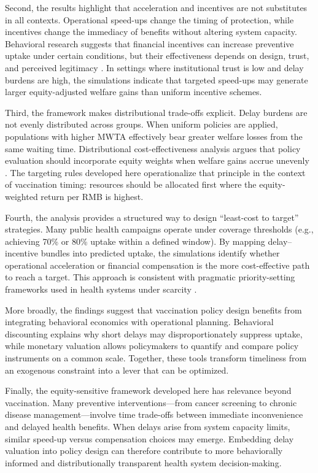 \documentclass[doublespacing]{utdthesis}
\let\cite=\citep
\begin{document}
Second, the results highlight that acceleration and incentives are not substitutes in all contexts. Operational speed-ups change the timing of protection, while incentives change the immediacy of benefits without altering system capacity. Behavioral research suggests that financial incentives can increase preventive uptake under certain conditions, but their effectiveness depends on design, trust, and perceived legitimacy \cite{Gneezy2011,Thirumurthy2022}. In settings where institutional trust is low and delay burdens are high, the simulations indicate that targeted speed-ups may generate larger equity-adjusted welfare gains than uniform incentive schemes.

Third, the framework makes distributional trade-offs explicit. Delay burdens are not evenly distributed across groups. When uniform policies are applied, populations with higher MWTA effectively bear greater welfare losses from the same waiting time. Distributional cost-effectiveness analysis argues that policy evaluation should incorporate equity weights when welfare gains accrue unevenly \cite{Asaria2016,Cookson2017}. The targeting rules developed here operationalize that principle in the context of vaccination timing: resources should be allocated first where the equity-weighted return per RMB is highest.

Fourth, the analysis provides a structured way to design “least-cost to target” strategies. Many public health campaigns operate under coverage thresholds (e.g., achieving 70\% or 80\% uptake within a defined window). By mapping delay–incentive bundles into predicted uptake, the simulations identify whether operational acceleration or financial compensation is the more cost-effective path to reach a target. This approach is consistent with pragmatic priority-setting frameworks used in health systems under scarcity \cite{Emanuel2020,Norheim2014}.

More broadly, the findings suggest that vaccination policy design benefits from integrating behavioral economics with operational planning. Behavioral discounting explains why short delays may disproportionately suppress uptake, while monetary valuation allows policymakers to quantify and compare policy instruments on a common scale. Together, these tools transform timeliness from an exogenous constraint into a lever that can be optimized.

Finally, the equity-sensitive framework developed here has relevance beyond vaccination. Many preventive interventions—from cancer screening to chronic disease management—involve time trade-offs between immediate inconvenience and delayed health benefits. When delays arise from system capacity limits, similar speed-up versus compensation choices may emerge. Embedding delay valuation into policy design can therefore contribute to more behaviorally informed and distributionally transparent health system decision-making.
\end{document}
